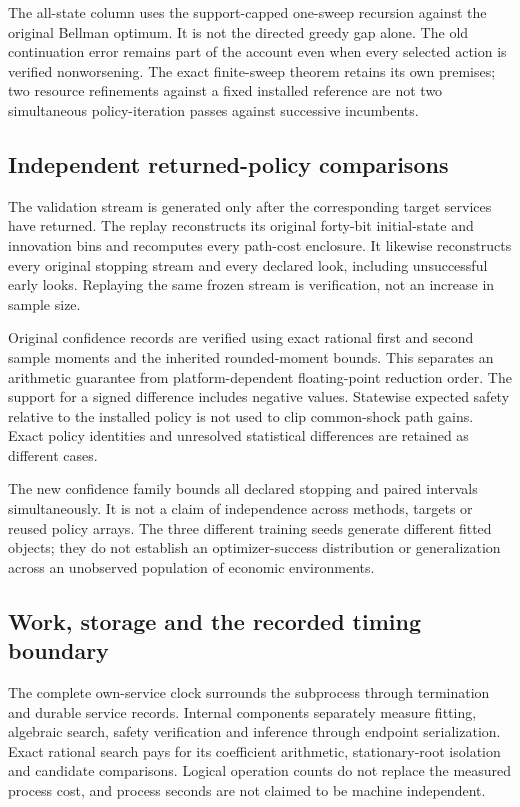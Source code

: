 The all-state column uses the support-capped one-sweep recursion against the original Bellman optimum. It is not the directed greedy gap alone. The old continuation error remains part of the account even when every selected action is verified nonworsening. The exact finite-sweep theorem retains its own premises; two resource refinements against a fixed installed reference are not two simultaneous policy-iteration passes against successive incumbents.

\subsection{Independent returned-policy comparisons}

The validation stream is generated only after the corresponding target services have returned. The replay reconstructs its original forty-bit initial-state and innovation bins and recomputes every path-cost enclosure. It likewise reconstructs every original stopping stream and every declared look, including unsuccessful early looks. Replaying the same frozen stream is verification, not an increase in sample size.

Original confidence records are verified using exact rational first and second sample moments and the inherited rounded-moment bounds. This separates an arithmetic guarantee from platform-dependent floating-point reduction order. The support for a signed difference includes negative values. Statewise expected safety relative to the installed policy is not used to clip common-shock path gains. Exact policy identities and unresolved statistical differences are retained as different cases.

The new confidence family bounds all declared stopping and paired intervals simultaneously. It is not a claim of independence across methods, targets or reused policy arrays. The three different training seeds generate different fitted objects; they do not establish an optimizer-success distribution or generalization across an unobserved population of economic environments.

\subsection{Work, storage and the recorded timing boundary}

The complete own-service clock surrounds the subprocess through termination and durable service records. Internal components separately measure fitting, algebraic search, safety verification and inference through endpoint serialization. Exact rational search pays for its coefficient arithmetic, stationary-root isolation and candidate comparisons. Logical operation counts do not replace the measured process cost, and process seconds are not claimed to be machine independent.

